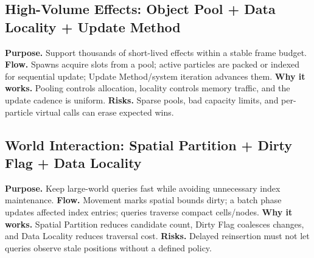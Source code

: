\documentclass[11pt]{article}
\begin{document}
\subsection{High-Volume Effects: Object Pool + Data Locality + Update Method}
\textbf{Purpose.} Support thousands of short-lived effects within a stable frame budget. \textbf{Flow.} Spawns acquire slots from a pool; active particles are packed or indexed for sequential update; Update Method/system iteration advances them. \textbf{Why it works.} Pooling controls allocation, locality controls memory traffic, and the update cadence is uniform. \textbf{Risks.} Sparse pools, bad capacity limits, and per-particle virtual calls can erase expected wins.

\subsection{World Interaction: Spatial Partition + Dirty Flag + Data Locality}
\textbf{Purpose.} Keep large-world queries fast while avoiding unnecessary index maintenance. \textbf{Flow.} Movement marks spatial bounds dirty; a batch phase updates affected index entries; queries traverse compact cells/nodes. \textbf{Why it works.} Spatial Partition reduces candidate count, Dirty Flag coalesces changes, and Data Locality reduces traversal cost. \textbf{Risks.} Delayed reinsertion must not let queries observe stale positions without a defined policy.
\end{document}
